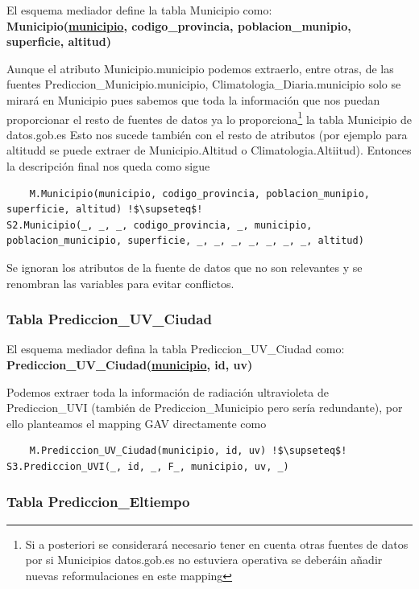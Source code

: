 \documentclass[12pt, a4paper]{article}
\begin{document}
El esquema mediador define la tabla Municipio como:\\
\textbf{Municipio(\underline{municipio}, codigo\_provincia, poblacion\_munipio, superficie, altitud)}

Aunque el atributo Municipio.municipio podemos extraerlo, entre otras, de las fuentes Prediccion\_Municipio.municipio, Climatologia\_Diaria.municipio solo se mirará en Municipio pues sabemos que toda la información que nos puedan proporcionar el resto de fuentes de datos ya lo proporciona\footnote{Si a posteriori se considerará necesario tener en cuenta otras fuentes de datos por si Municipios datos.gob.es no estuviera operativa se deberáin añadir nuevas reformulaciones en este mapping} la tabla Municipio de datos.gob.es Esto nos sucede también con el resto de atributos (por ejemplo para altitudd se puede extraer de Municipio.Altitud o Climatologia.Altiitud). Entonces la descripción final nos queda como sigue

\begin{lstlisting}
    M.Municipio(municipio, codigo_provincia, poblacion_munipio, superficie, altitud) !$\supseteq$!
S2.Municipio(_, _, _, codigo_provincia, _, municipio, poblacion_municipio, superficie, _, _, _, _, _, _, _, altitud)
\end{lstlisting}
Se ignoran los atributos de la fuente de datos que no son relevantes y se renombran las variables para evitar conflictos.

\subsubsection{Tabla Prediccion\_UV\_Ciudad}

El esquema mediador defina la tabla Prediccion\_UV\_Ciudad como:\\
\textbf{Prediccion\_UV\_Ciudad(\underline{municipio}, id, uv)}

Podemos extraer toda la información de radiación ultravioleta de Prediccion\_UVI (también de Prediccion\_Municipio pero sería redundante), por ello planteamos el mapping GAV directamente como
\begin{lstlisting}
    M.Prediccion_UV_Ciudad(municipio, id, uv) !$\supseteq$!
S3.Prediccion_UVI(_, id, _, F_, municipio, uv, _)
\end{lstlisting}

\subsubsection{Tabla Prediccion\_Eltiempo}
\end{document}
